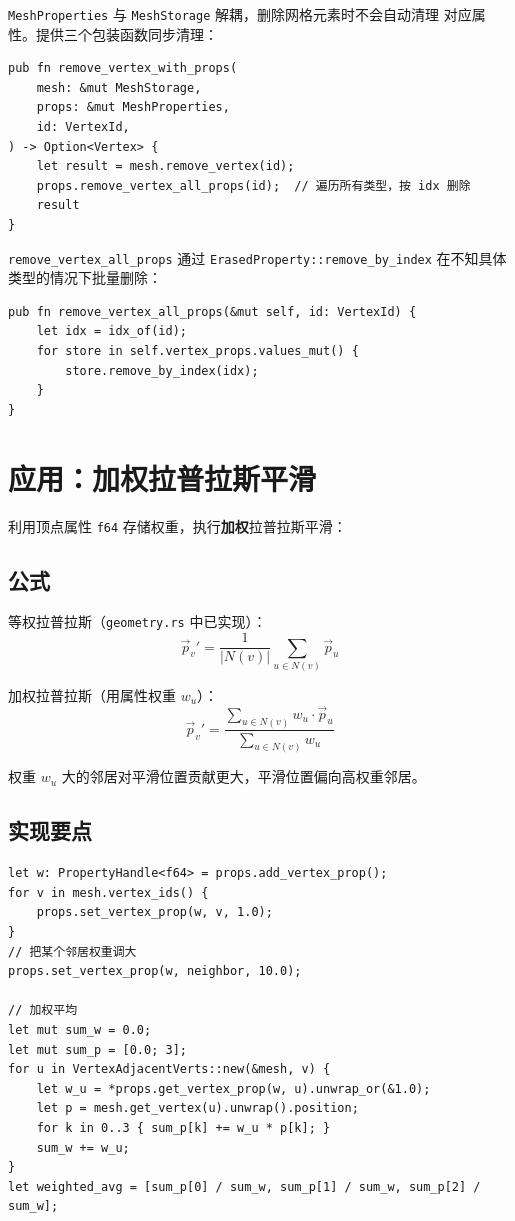 \documentclass[11pt,a4paper]{article}
\begin{document}
\texttt{MeshProperties} 与 \texttt{MeshStorage} 解耦，删除网格元素时不会自动清理
对应属性。提供三个包装函数同步清理：

\begin{lstlisting}
pub fn remove_vertex_with_props(
    mesh: &mut MeshStorage,
    props: &mut MeshProperties,
    id: VertexId,
) -> Option<Vertex> {
    let result = mesh.remove_vertex(id);
    props.remove_vertex_all_props(id);  // 遍历所有类型，按 idx 删除
    result
}
\end{lstlisting}

\texttt{remove\_vertex\_all\_props} 通过 \texttt{ErasedProperty::remove\_by\_index}
在不知具体类型的情况下批量删除：

\begin{lstlisting}
pub fn remove_vertex_all_props(&mut self, id: VertexId) {
    let idx = idx_of(id);
    for store in self.vertex_props.values_mut() {
        store.remove_by_index(idx);
    }
}
\end{lstlisting}

\section{应用：加权拉普拉斯平滑}

利用顶点属性 \texttt{f64} 存储权重，执行\textbf{加权}拉普拉斯平滑：

\subsection{公式}

等权拉普拉斯（\texttt{geometry.rs} 中已实现）：
\[
\vec{p}_v' = \frac{1}{|N(v)|} \sum_{u \in N(v)} \vec{p}_u
\]

加权拉普拉斯（用属性权重 $w_u$）：
\[
\vec{p}_v' = \frac{\displaystyle\sum_{u \in N(v)} w_u \cdot \vec{p}_u}{\displaystyle\sum_{u \in N(v)} w_u}
\]

权重 $w_u$ 大的邻居对平滑位置贡献更大，平滑位置偏向高权重邻居。

\subsection{实现要点}

\begin{lstlisting}
let w: PropertyHandle<f64> = props.add_vertex_prop();
for v in mesh.vertex_ids() {
    props.set_vertex_prop(w, v, 1.0);
}
// 把某个邻居权重调大
props.set_vertex_prop(w, neighbor, 10.0);

// 加权平均
let mut sum_w = 0.0;
let mut sum_p = [0.0; 3];
for u in VertexAdjacentVerts::new(&mesh, v) {
    let w_u = *props.get_vertex_prop(w, u).unwrap_or(&1.0);
    let p = mesh.get_vertex(u).unwrap().position;
    for k in 0..3 { sum_p[k] += w_u * p[k]; }
    sum_w += w_u;
}
let weighted_avg = [sum_p[0] / sum_w, sum_p[1] / sum_w, sum_p[2] / sum_w];
\end{lstlisting}
\end{document}
